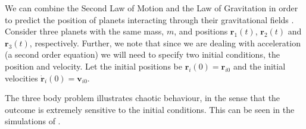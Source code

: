 \begin{itemize}
\begin{example}[frametitle=Three body problem]\label{Three_body_problem}
We can combine the Second Law of Motion and the Law of Gravitation in order to predict the position of planets interacting through their gravitational fields . Consider three planets with the same mass, $m$, and positions $\bm{r}_1(t)$, $\bm{r}_2(t)$ and $\bm{r}_3(t)$, respectively. Further, we note that since we are dealing with acceleration (a second order equation) we will need to specify two initial conditions, the position and velocity. Let the initial positions be $\bm{r}_i(0)=\bm{r}_{i0}$ and the initial velocities $\dot{\bm{r}}_i(0)=\bm{v}_{i0}$.

The three body problem illustrates chaotic behaviour, in the sense that the outcome is extremely sensitive to the initial conditions. This can be seen in the simulations of .


\end{example}
\end{itemize}
